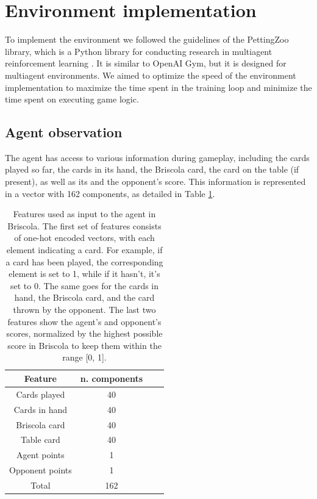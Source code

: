 \section{Environment implementation}
To implement the environment we followed the guidelines of the PettingZoo library, which is a Python library for conducting research in multiagent reinforcement learning \cite{pettingzoo}. It is similar to OpenAI Gym, but it is designed for multiagent environments. We aimed to optimize the speed of the environment implementation to maximize the time spent in the training loop and minimize the time spent on executing game logic.

\subsection{Agent observation}
The agent has access to various information during gameplay, including the cards played so far, the cards in its hand, the Briscola card, the card on the table (if present), as well as its and the opponent's score. This information is represented in a vector with 162 components, as detailed in Table \ref{tab:state}.

\begin{table}[H]
    \centering
    \begin{tabular}{c c c c} 
     \hline
     Feature & n. components \\
     \hline
        Cards played & 40 \\
        Cards in hand & 40 \\
        Briscola card & 40 \\
        Table card & 40 \\
        \hline
        Agent points & 1 \\
        Opponent points & 1 \\
        \hline
        Total & 162 \\
        \hline
    \end{tabular}

    \caption{Features used as input to the agent in Briscola. The first set of features consists of one-hot encoded vectors, with each element indicating a card. For example, if a card has been played, the corresponding element is set to 1, while if it hasn't, it's set to 0. The same goes for the cards in hand, the Briscola card, and the card thrown by the opponent. The last two features show the agent's and opponent's scores, normalized by the highest possible score in Briscola to keep them within the range [0, 1].}
    \label{tab:state}
\end{table}

